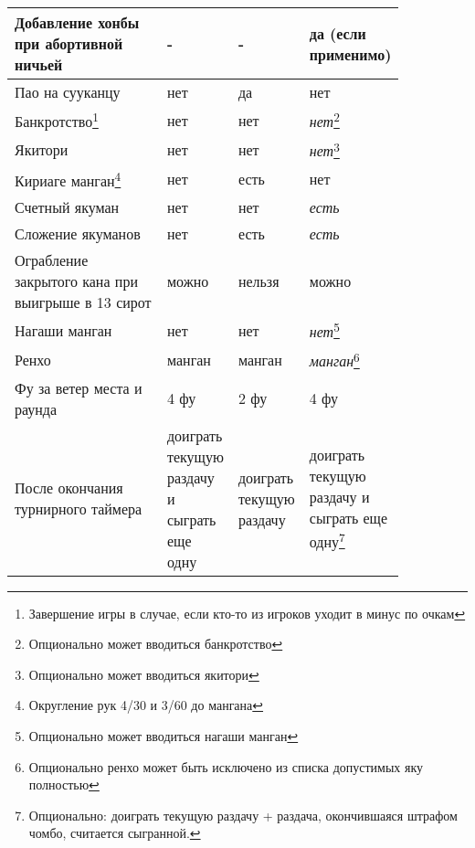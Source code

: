 \begin{tabularx}{\linewidth}{L{0.4\linewidth}L{0.15\linewidth}L{0.15\linewidth}L{0.15\linewidth}}
	Добавление хонбы при абортивной ничьей &
	- &
	- &
	да (если применимо) \\
	\midrule
	Пао на сууканцу &
	нет &
	да &
	нет \\
	\midrule
	Банкротство\footnote{Завершение игры в случае, если кто-то из игроков уходит в минус по очкам} &
	нет &
	нет &
	\textit{нет}\footnote{Опционально может вводиться банкротство} \\
	\midrule
	Якитори &
	нет &
	нет &
	\textit{нет}\footnote{Опционально может вводиться якитори} \\
	\midrule
	Кириаге манган\footnote{Округление рук 4/30 и 3/60 до мангана} &
	нет &
	есть &
	нет \\
	\midrule
	Счетный якуман &
	нет &
	нет &
	\textit{есть} \\
	\midrule
	Сложение якуманов &
	нет &
	есть &
	\textit{есть} \\
	\midrule
	Ограбление закрытого кана при выигрыше в 13 сирот &
	можно &
	нельзя &
	можно \\
	\midrule
	Нагаши манган &
	нет &
	нет &
	\textit{нет}\footnote{Опционально может вводиться нагаши манган} \\
	\midrule
	Ренхо &
	манган &
	манган &
	\textit{манган}\footnote{Опционально ренхо может быть исключено из списка допустимых яку полностью} \\
	\midrule
	Фу за ветер места и раунда &
	4 фу &
	2 фу &
	4 фу \\
	\midrule
	После окончания турнирного таймера &
	доиграть текущую раздачу и сыграть еще одну &
	доиграть текущую раздачу &
	доиграть текущую раздачу и сыграть еще одну\footnote{Опционально: доиграть текущую раздачу + раздача, окончившаяся штрафом чомбо, считается сыгранной.} \\
	

\end{tabularx}
